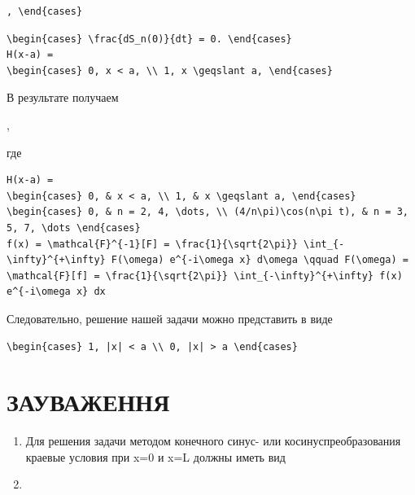 \documentclass[
  ukrainian,
]{article}
\begin{document}
\begin{verbatim}
, \end{cases}
\end{verbatim}

\begin{verbatim}
\begin{cases} \frac{dS_n(0)}{dt} = 0. \end{cases}
H(x-a) =
\begin{cases} 0, x < a, \\ 1, x \geqslant a, \end{cases}
\end{verbatim}

В результате получаем

,

где

\begin{verbatim}
H(x-a) =
\begin{cases} 0, & x < a, \\ 1, & x \geqslant a, \end{cases}
\begin{cases} 0, & n = 2, 4, \dots, \\ (4/n\pi)\cos(n\pi t), & n = 3, 5, 7, \dots \end{cases}
f(x) = \mathcal{F}^{-1}[F] = \frac{1}{\sqrt{2\pi}} \int_{-\infty}^{+\infty} F(\omega) e^{-i\omega x} d\omega \qquad F(\omega) = \mathcal{F}[f] = \frac{1}{\sqrt{2\pi}} \int_{-\infty}^{+\infty} f(x) e^{-i\omega x} dx
\end{verbatim}

Следовательно, решение нашей задачи можно представить в виде

\begin{verbatim}
\begin{cases} 1, |x| < a \\ 0, |x| > a \end{cases}
\end{verbatim}

\section{ЗАУВАЖЕННЯ}\label{ux437ux430ux443ux432ux430ux436ux435ux43dux43dux44f}

\begin{enumerate}
\def\labelenumi{\arabic{enumi}.}
\item
  Для решения задачи методом конечного синус- или косинуспреобразования
  краевые условия при x=0 и x=L должны иметь вид
\item
\end{enumerate}
\end{document}
